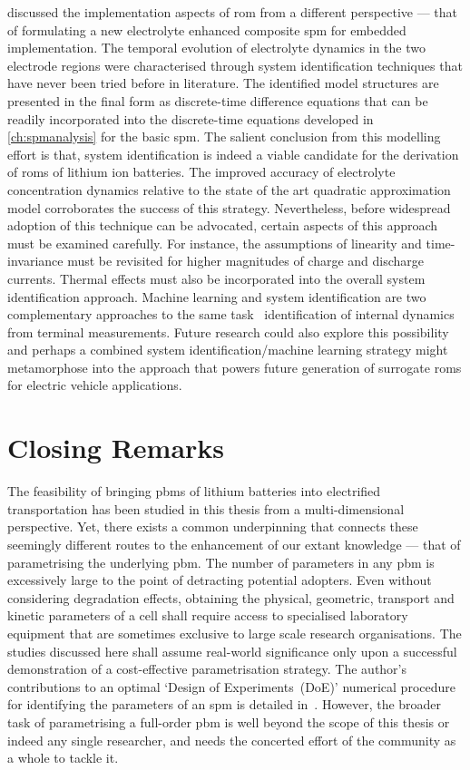  discussed the implementation aspects of \gls{rom}
from a different perspective --- that of formulating a new electrolyte enhanced
composite \gls{spm} for embedded implementation. The temporal evolution of
electrolyte dynamics in the two electrode regions were characterised through
system identification techniques that have never been tried before in
literature. The identified model structures are presented in the final form as
discrete-time difference equations that can be readily incorporated into the
discrete-time equations developed in \cref{ch:spmanalysis} for the basic
\gls{spm}. The salient conclusion from this modelling effort is that, system
identification is indeed a viable candidate for the derivation of \glspl{rom} of
lithium ion batteries. The improved accuracy of electrolyte concentration
dynamics relative to the state of the art quadratic approximation model
corroborates the success of this strategy. Nevertheless, before widespread
adoption of this technique can be advocated, certain aspects of this approach
must be examined carefully. For instance, the assumptions of linearity and
time-invariance must be revisited for higher magnitudes of charge and discharge
currents. Thermal effects must also be incorporated into the overall system
identification approach. Machine learning and system identification are two
complementary approaches to the same task \ie~identification of internal
dynamics from terminal measurements. Future research could also explore this
possibility and perhaps a combined system identification/machine learning
strategy might metamorphose into the approach that powers future generation of
surrogate \glspl{rom} for electric vehicle applications.

\section{Closing Remarks}

The feasibility of bringing \glspl{pbm} of lithium batteries into electrified
transportation has been studied in this thesis from a multi-dimensional
perspective. Yet, there exists a common underpinning that connects these
seemingly different routes to the enhancement of our extant knowledge --- that
of parametrising the underlying \gls{pbm}. The number of parameters in any
\gls{pbm} is excessively large to the point of detracting potential adopters.
Even without considering degradation effects, obtaining the physical, geometric,
transport and kinetic parameters of a cell shall require access to specialised
laboratory equipment that are sometimes exclusive to large scale research
organisations. The studies discussed here shall assume real-world significance
only upon a successful demonstration of a cost-effective parametrisation
strategy. The author's contributions to an optimal `Design of Experiments~(DoE)'
numerical procedure for identifying the parameters of an \gls{spm} is detailed
in~\cite{Pozzi2018}. However, the broader task of parametrising a full-order
\gls{pbm} is well beyond the scope of this thesis or indeed any single
researcher, and needs the concerted effort of the community as a whole to tackle
it.

